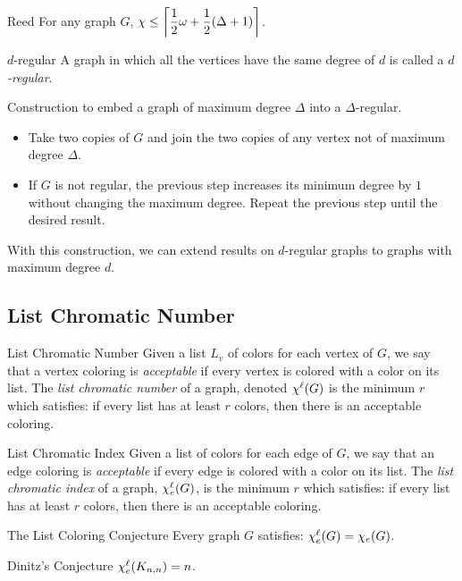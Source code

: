 \begin{conj}{Reed}
	For any graph $G$, $\chi\leq\left\lceil \dfrac{1}{2}\omega+\dfrac{1}{2}(\Delta+1) \right\rceil$.
\end{conj}
\begin{df}{$d$-regular}
	A graph in which all the vertices have the same degree of $d$ is called a \textit{$d$-regular}.	
\end{df}
\begin{rmk}
	Construction to embed a graph of maximum degree $\Delta$ into a $\Delta$-regular. 
	\begin{itemize}
		\item Take two copies of $G$ and join the two copies of any vertex not of maximum degree $\Delta$.
		\item If $G$ is not regular, the previous step increases its minimum degree by $1$ without changing the maximum degree. Repeat the previous step until the desired result. 
	\end{itemize}	
	With this construction, we can extend results on $d$-regular graphs to graphs with maximum degree $d$. 
\end{rmk}

\subsection{List Chromatic Number}
\begin{df}{List Chromatic Number}
	Given a list $L_v$ of colors for each vertex of $G$, we say that a vertex coloring is \textit{acceptable} if every vertex is colored with a color on its list. The \textit{list chromatic number} of a graph, denoted $\chi^\ell(G)$ is the minimum $r$ which satisfies: if every list has at least $r$ colors, then there is an acceptable coloring. 
\end{df}
\begin{df}{List Chromatic Index}
	Given a list of colors for each edge  of $G$, we say that an edge coloring is \textit{acceptable} if every edge is colored with a color on its list. The \textit{list chromatic index} of a graph, $\chi_e^\ell(G)$, is the minimum $r$ which satisfies: if every list has at least $r$ colors, then there is an acceptable coloring. 	
\end{df}
\begin{conj}{The List Coloring Conjecture}
	Every graph $G$ satisfies: $\chi_e^\ell(G)=\chi_e(G)$.	
\end{conj}
\begin{conj}{Dinitz's Conjecture}
	$\chi_e^\ell(K_{n,n})=n$.	
\end{conj}

